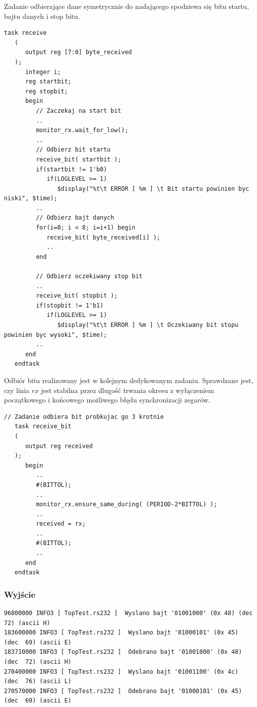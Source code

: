 \documentclass[a4paper,12pt]{article}
\begin{document}
Zadanie odbierające dane symetrycznie do nadającego spodziewa się bitu startu, bajtu danych i stop bitu.
\begin{lstlisting}[label=sim/Rs232 behav,caption=sim/Rs232 behav.v,firstnumber=118]
   task receive
   (
      output reg [7:0] byte_received
   );
      integer i;
      reg startbit;
      reg stopbit;
      begin
         // Zaczekaj na start bit
         ..
         monitor_rx.wait_for_low();
         ..
         // Odbierz bit startu
         receive_bit( startbit );
         if(startbit != 1'b0)
            if(LOGLEVEL >= 1)
               $display("%t\t ERROR [ %m ] \t Bit startu powinien byc niski", $time);
         ..
         // Odbierz bajt danych
         for(i=0; i < 8; i=i+1) begin
            receive_bit( byte_received[i] );
            ..
         end

         // Odbierz oczekiwany stop bit
         ..
         receive_bit( stopbit );
         if(stopbit != 1'b1)
            if(LOGLEVEL >= 1)
               $display("%t\t ERROR [ %m ] \t Oczekiwany bit stopu powinien byc wysoki", $time);
         ..
      end
   endtask
\end{lstlisting}

Odbiór bitu realizowany jest w kolejnym dedykowanym zadaniu. Sprawdzane jest, czy linia $rx$ jest stabilna przez dlugość trwania okresu z wyłączeniem początkowego i końcowego możliwego błędu synchronizacji zegarów.
\begin{lstlisting}[label=sim/Rs232 behav,caption=sim/Rs232 behav.v,firstnumber=89]
   // Zadanie odbiera bit probkujac go 3 krotnie
   task receive_bit
   (
      output reg received
   );
      begin
         ..
         #(BITTOL);
         ..
         monitor_rx.ensure_same_during( (PERIOD-2*BITTOL) );
         ..
         received = rx;
         ..
         #(BITTOL);
         ..
      end
   endtask
\end{lstlisting}


\subsubsection{Wyjście}

\begin{verbatim}
96800000 INFO3 [ TopTest.rs232 ]  Wyslano bajt '01001000' (0x 48) (dec  72) (ascii H)
183600000 INFO3 [ TopTest.rs232 ]  Wyslano bajt '01000101' (0x 45) (dec  69) (ascii E)
183710000 INFO3 [ TopTest.rs232 ]  Odebrano bajt '01001000' (0x 48) (dec  72) (ascii H)
270400000 INFO3 [ TopTest.rs232 ]  Wyslano bajt '01001100' (0x 4c) (dec  76) (ascii L)
270570000 INFO3 [ TopTest.rs232 ]  Odebrano bajt '01000101' (0x 45) (dec  69) (ascii E)
\end{verbatim}
\end{document}
